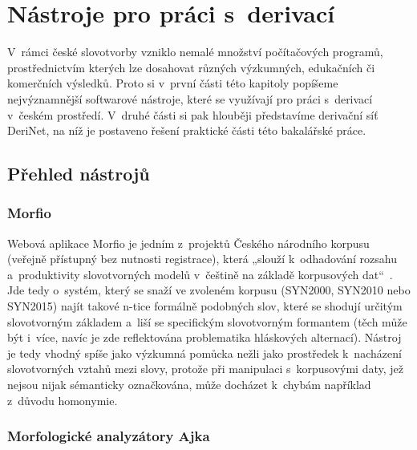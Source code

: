 \hypertarget{nuxe1stroje-pro-pruxe1ci-s-derivacuxed}{%
\chapter{Nástroje pro práci
s~derivací}\label{nuxe1stroje-pro-pruxe1ci-s-derivacuxed}}

V~rámci české slovotvorby vzniklo nemalé množství počítačových programů,
prostřednictvím kterých lze dosahovat různých výzkumných, edukačních či
komerčních výsledků. Proto si v~první části této kapitoly popíšeme
nejvýznamnější softwarové nástroje, které se využívají pro práci
s~derivací v~českém prostředí. V~druhé části si pak hlouběji představíme
derivační síť DeriNet, na níž je postaveno řešení praktické části této
bakalářské práce.

\hypertarget{pux159ehled-nuxe1strojux16f}{%
\section{Přehled nástrojů}\label{pux159ehled-nuxe1strojux16f}}

\hypertarget{morfio}{%
\subsection{Morfio}\label{morfio}}

Webová aplikace Morfio je jedním z~projektů Českého národního korpusu
(veřejně přístupný bez nutnosti registrace), která „slouží k~odhadování
rozsahu a~produktivity slovotvorných modelů v~češtině na základě
korpusových dat``~\parencite{cvrcek13}. Jde tedy o~systém, který se
snaží ve zvoleném korpusu (SYN2000, SYN2010 nebo SYN2015) najít takové
n-tice formálně podobných slov, které se shodují určitým slovotvorným
základem a~liší se specifickým slovotvorným formantem (těch může být
i~více, navíc je zde reflektována problematika hláskových alternací).
Nástroj je tedy vhodný spíše jako výzkumná pomůcka nežli jako prostředek
k~nacházení slovotvorných vztahů mezi slovy, protože při manipulaci
s~korpusovými daty, jež nejsou nijak sémanticky označkována, může docházet
k~chybám například z~důvodu homonymie.~\parencite{cvrcek13}

\hypertarget{morfologickuxe9-analyzuxe1tory-ajka}{%
\subsection{Morfologické analyzátory
Ajka}\label{morfologickuxe9-analyzuxe1tory-ajka}}

